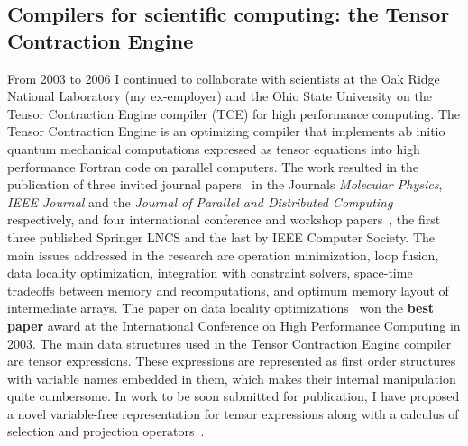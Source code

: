 \documentclass[titlepage, %
11pt, 
]{article}
\newcommand{\achievement}[1]{\textcolor{OliveGreen}{\bf #1}}
\begin{document}
\subsection{Compilers for scientific computing: the Tensor Contraction Engine}
\label{subsec:compilers}

From 2003 to 2006 I continued to collaborate with scientists
at the Oak Ridge National Laboratory (my ex-employer) and
the Ohio State University on the Tensor Contraction Engine
compiler (TCE) for high performance computing.  The Tensor
Contraction Engine is an optimizing compiler that implements
ab initio quantum mechanical computations expressed as
tensor equations into high performance Fortran code on
parallel computers.  The work resulted in the publication of
three invited journal
papers~\cite{Auer-MolPhysics-2006,Baumgartner-ieee-2005,krishnan-et-al-jpdc-2006}
in the Journals {\em Molecular Physics}, {\em IEEE
  Journal\/} and the {\em Journal of Parallel and
  Distributed Computing\/} respectively, and four
international conference and workshop
papers~\cite{Bibireata-et-al-LCPC-2004,Hartono-et-al-iccs-2006,Krishnan-et-al-HiPC-2003,Krishnan-et-al-IPDPS-2004},
the first three published Springer LNCS and the last by IEEE
Computer Society.  The main issues addressed in the research
are operation minimization, loop fusion, data locality
optimization, integration with constraint solvers,
space-time tradeoffs between memory and recomputations, and
optimum memory layout of intermediate arrays.  The paper on
data locality optimizations~\cite{Krishnan-et-al-HiPC-2003}
won the \achievement{best paper\/} award at the
International Conference on High Performance Computing in
2003.  The main data structures used in the Tensor
Contraction Engine compiler are tensor expressions.  These
expressions are represented as first order structures with
variable names embedded in them, which makes their internal
manipulation quite cumbersome.  In work to be soon submitted
for publication, I have proposed a novel variable-free
representation for tensor expressions along with a calculus
of selection and projection
operators~\cite{Choppella-et-al-var-free-tce-in-preparation}.



\renewcommand{\multirowsetup}{\centering}
\renewcommand{\arrayrulewidth}{1.0pt}  %
\renewcommand{\arraystretch}{1.5}
\end{document}
